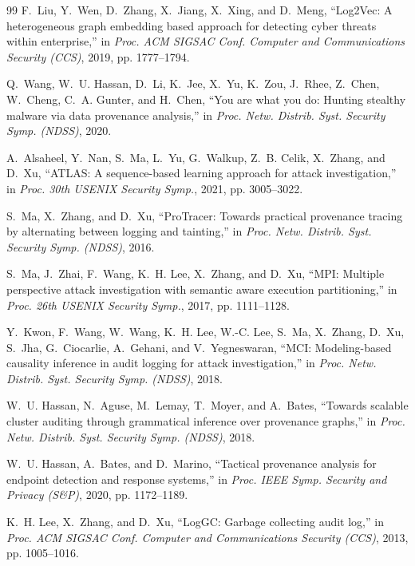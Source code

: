 \documentclass[lettersize,journal]{IEEEtran}
\begin{document}
\begin{thebibliography}{99}
F.~Liu, Y.~Wen, D.~Zhang, X.~Jiang, X.~Xing, and D.~Meng, ``Log2Vec: A
heterogeneous graph embedding based approach for detecting cyber threats within
enterprise,'' in \emph{Proc. ACM SIGSAC Conf. Computer and Communications
Security (CCS)}, 2019, pp. 1777--1794.

Q.~Wang, W.~U. Hassan, D.~Li, K.~Jee, X.~Yu, K.~Zou, J.~Rhee, Z.~Chen,
W.~Cheng, C.~A. Gunter, and H.~Chen, ``You are what you do: Hunting stealthy
malware via data provenance analysis,'' in \emph{Proc. Netw. Distrib. Syst.
Security Symp. (NDSS)}, 2020.

A.~Alsaheel, Y.~Nan, S.~Ma, L.~Yu, G.~Walkup, Z.~B. Celik, X.~Zhang, and
D.~Xu, ``ATLAS: A sequence-based learning approach for attack investigation,''
in \emph{Proc. 30th USENIX Security Symp.}, 2021, pp. 3005--3022.

S.~Ma, X.~Zhang, and D.~Xu, ``ProTracer: Towards practical provenance tracing
by alternating between logging and tainting,'' in \emph{Proc. Netw. Distrib.
Syst. Security Symp. (NDSS)}, 2016.

S.~Ma, J.~Zhai, F.~Wang, K.~H. Lee, X.~Zhang, and D.~Xu, ``MPI: Multiple
perspective attack investigation with semantic aware execution partitioning,''
in \emph{Proc. 26th USENIX Security Symp.}, 2017, pp. 1111--1128.

Y.~Kwon, F.~Wang, W.~Wang, K.~H. Lee, W.-C. Lee, S.~Ma, X.~Zhang, D.~Xu,
S.~Jha, G.~Ciocarlie, A.~Gehani, and V.~Yegneswaran, ``MCI: Modeling-based
causality inference in audit logging for attack investigation,'' in \emph{Proc.
Netw. Distrib. Syst. Security Symp. (NDSS)}, 2018.

W.~U. Hassan, N.~Aguse, M.~Lemay, T.~Moyer, and A.~Bates, ``Towards scalable
cluster auditing through grammatical inference over provenance graphs,'' in
\emph{Proc. Netw. Distrib. Syst. Security Symp. (NDSS)}, 2018.

W.~U. Hassan, A.~Bates, and D.~Marino, ``Tactical provenance analysis for
endpoint detection and response systems,'' in \emph{Proc. IEEE Symp. Security
and Privacy (S\&P)}, 2020, pp. 1172--1189.

K.~H. Lee, X.~Zhang, and D.~Xu, ``LogGC: Garbage collecting audit log,'' in
\emph{Proc. ACM SIGSAC Conf. Computer and Communications Security (CCS)}, 2013,
pp. 1005--1016.


\end{thebibliography}
\end{document}
